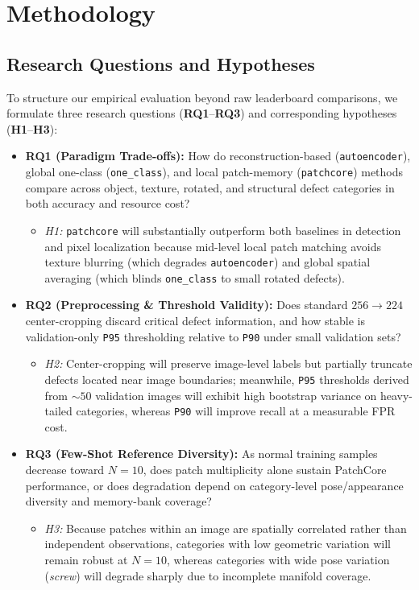 \documentclass[conference]{IEEEtran}
\begin{document}
\section{Methodology}

\subsection{Research Questions and Hypotheses}
To structure our empirical evaluation beyond raw leaderboard comparisons, we formulate three research questions (\textbf{RQ1}--\textbf{RQ3}) and corresponding hypotheses (\textbf{H1}--\textbf{H3}):
\begin{itemize}
    \item \textbf{RQ1 (Paradigm Trade-offs):} How do reconstruction-based (\texttt{autoencoder}), global one-class (\texttt{one\_class}), and local patch-memory (\texttt{patchcore}) methods compare across object, texture, rotated, and structural defect categories in both accuracy and resource cost?
    \begin{itemize}
        \item \textit{H1:} \texttt{patchcore} will substantially outperform both baselines in detection and pixel localization because mid-level local patch matching avoids texture blurring (which degrades \texttt{autoencoder}) and global spatial averaging (which blinds \texttt{one\_class} to small rotated defects).
    \end{itemize}
    \item \textbf{RQ2 (Preprocessing \& Threshold Validity):} Does standard $256 \rightarrow 224$ center-cropping discard critical defect information, and how stable is validation-only \texttt{P95} thresholding relative to \texttt{P90} under small validation sets?
    \begin{itemize}
        \item \textit{H2:} Center-cropping will preserve image-level labels but partially truncate defects located near image boundaries; meanwhile, \texttt{P95} thresholds derived from $\sim 50$ validation images will exhibit high bootstrap variance on heavy-tailed categories, whereas \texttt{P90} will improve recall at a measurable FPR cost.
    \end{itemize}
    \item \textbf{RQ3 (Few-Shot Reference Diversity):} As normal training samples decrease toward $N=10$, does patch multiplicity alone sustain PatchCore performance, or does degradation depend on category-level pose/appearance diversity and memory-bank coverage?
    \begin{itemize}
        \item \textit{H3:} Because patches within an image are spatially correlated rather than independent observations, categories with low geometric variation will remain robust at $N=10$, whereas categories with wide pose variation (\textit{screw}) will degrade sharply due to incomplete manifold coverage.
    \end{itemize}
\end{itemize}
\end{document}
